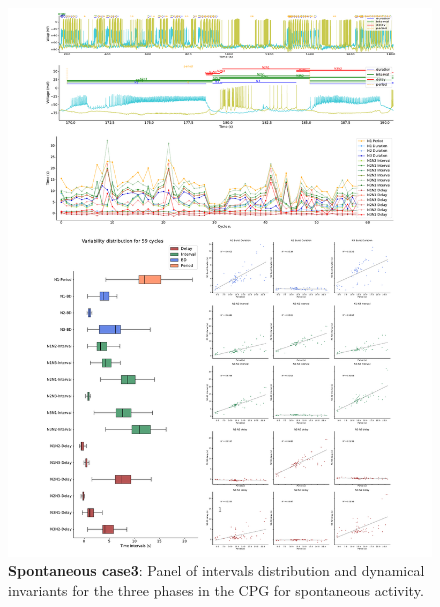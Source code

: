 \begin{figure}[htbp]
	\centering
	\includegraphics[width=1.1\textwidth]{./invariants/data/SUSSEX/prep3/images/3phases/panel_with_intervals.pdf}
	\caption{\textbf{Spontaneous case3}: Panel of intervals distribution and dynamical invariants for the three phases in the CPG for spontaneous activity.}
	\label{fig:prep3 invariants}
\end{figure}


